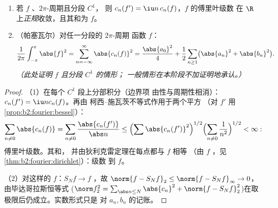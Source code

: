 \begin{theorem}\label{thm:b2:fourier:parseval}
\begin{enumerate}
  \item 若 $f$ 、$2\pi$-周期且分段 $C^1$，
        则 $c_n(f') = \iu n\,c_n(f)$，$f$ 的傅里叶级数
        在 $\R$ 上\emph{正规}收敛，且其和为 $f$。
  \item （帕塞瓦尔）对任一分段的 $2\pi$-周期
        函数 $f$：
        \[
        \frac{1}{2\pi}\int_{-\pi}^{\pi}\abs{f}^2
        = \sum_{n=-\infty}^{\infty} \abs{c_n(f)}^2
        = \frac{\abs{a_0}^2}{4} + \frac12\sum_{n\geq1}
        \bigl(\abs{a_n}^2 + \abs{b_n}^2\bigr).
        \]
        \emph{（此处证明 $f$ 且分段 $C^1$ 的情形；
        一般情形在本阶段不加证明地承认。）}
\end{enumerate}
\end{theorem}

\begin{proof}
（1）在每个 $C^1$ 段上分部积分（边界项
由性与周期性相消）：$c_n(f') = \iu n c_n(f)$。再由
柯西–施瓦茨不等式作用于两个平方
（对 $f'$ 用\cref{prop:b2:fourier:bessel}）：
\[
\sum_{n \neq 0} \abs{c_n(f)} = \sum_{n\neq0}
\frac{\abs{c_n(f')}}{\abs n}
\leq \Bigl(\sum \abs{c_n(f')}^2\Bigr)^{1/2}
\Bigl(\sum_{n\neq0}\frac{1}{n^2}\Bigr)^{1/2} < \infty :
\]
傅里叶级数。其和，
并由狄利克雷定理在每点都与 $f$ 相等
（由 $f$ ，见\cref{thm:b2:fourier:dirichlet}）：级数
到 $f$。

（2）对这样的 $f$：$S_N f \to f$ ，故 $\norm{f - S_Nf}_2
\leq \norm{f - S_Nf}_\infty \to 0$，由毕达哥拉斯恒等式
($\norm f_2^2 = \sum_{\abs n \leq N}\abs{c_n}^2 + \norm{f -
S_Nf}_2^2$)在取极限后仍成立。实数形式只是
对 $a_n, b_n$ 的记账。
\end{proof}

